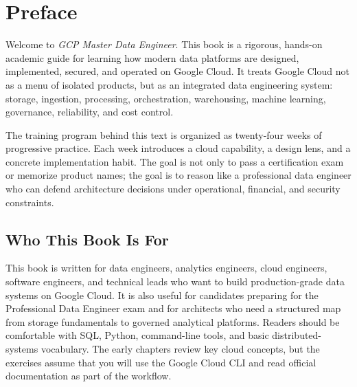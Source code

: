 \chapter*{Preface}
Welcome to \textit{GCP Master Data Engineer}. This book is a rigorous, hands-on academic guide for learning how modern data platforms are designed, implemented, secured, and operated on Google Cloud. It treats Google Cloud not as a menu of isolated products, but as an integrated data engineering system: storage, ingestion, processing, orchestration, warehousing, machine learning, governance, reliability, and cost control.

The training program behind this text is organized as twenty-four weeks of progressive practice. Each week introduces a cloud capability, a design lens, and a concrete implementation habit. The goal is not only to pass a certification exam or memorize product names; the goal is to reason like a professional data engineer who can defend architecture decisions under operational, financial, and security constraints.

\section*{Who This Book Is For}
This book is written for data engineers, analytics engineers, cloud engineers, software engineers, and technical leads who want to build production-grade data systems on Google Cloud. It is also useful for candidates preparing for the Professional Data Engineer exam and for architects who need a structured map from storage fundamentals to governed analytical platforms. Readers should be comfortable with SQL, Python, command-line tools, and basic distributed-systems vocabulary. The early chapters review key cloud concepts, but the exercises assume that you will use the Google Cloud CLI and read official documentation as part of the workflow.

